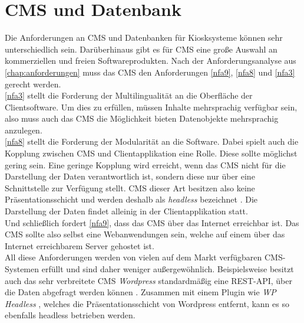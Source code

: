 \section{CMS und Datenbank}
\label{sec:backend}

Die Anforderungen an CMS und Datenbanken für Kiosksysteme können sehr unterschiedlich sein. 
Darüberhinaus gibt es für CMS eine große Auswahl an kommerziellen und freien Softwareprodukten.
Nach der Anforderungsanalyse aus \autoref{chap:anforderungen} muss das CMS den Anforderungen
\ref{nfa9}, \ref{nfa8} und \ref{nfa3} gerecht werden.\\

\ref{nfa3} stellt die Forderung der Multilingualität an die Oberfläche der Clientsoftware. 
Um dies zu erfüllen, müssen Inhalte mehrsprachig verfügbar sein, also muss auch 
das CMS die Möglichkeit bieten Datenobjekte mehrsprachig anzulegen.\\
\ref{nfa8} stellt die Forderung der Modularität an die Software. 
Dabei spielt auch die Kopplung zwischen CMS und 
Clientapplikation eine Rolle. Diese sollte möglichst gering sein. Eine geringe Kopplung
wird erreicht, wenn das CMS nicht für die Darstellung der Daten verantwortlich ist, sondern 
diese nur über eine Schnittstelle zur Verfügung stellt. CMS dieser Art besitzen also 
keine Präsentationsschicht und werden deshalb als \emph{headless} bezeichnet \cite{headless-market}.
Die Darstellung der Daten findet alleinig in der Clientapplikation statt.\\
Und schließlich fordert \ref{nfa9}, dass das CMS über das Internet erreichbar ist. 
Das CMS sollte also selbst eine Webanwendungen sein, welche auf einem über das Internet erreichbarem Server
gehostet ist.\\

All diese Anforderungen werden von vielen auf dem Markt verfügbaren CMS-Systemen erfüllt
und sind daher weniger außergewöhnlich. Beispielsweise besitzt auch das sehr verbreitete CMS \emph{Wordpress} 
standardmäßig eine REST-API, über die Daten abgefragt werden können \cite{wordpress}. Zusammen mit einem 
Plugin wie \emph{WP Headless} \cite{wordpress-headless}, welches die Präsentationsschicht von Wordpress
entfernt, kann es so ebenfalls headless betrieben werden. \\

